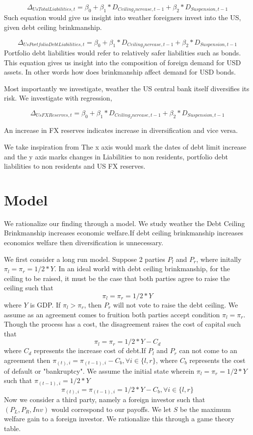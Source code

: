 \documentclass[12pt]{article}
\begin{document}
$$\Delta_{UsTotalLiabilities,t}=\beta_0+\beta_1*D_{Ceiling_Increase,t-1}+\beta_2*D_{Suspension,t-1}$$ Such equation would give us insight into weather foreigners invest into the US, given debt ceiling brinkmanship. 

$$\Delta_{UsPortfolio Debt Liabilities,t}=\beta_0+\beta_1*D_{Ceiling_Increase,t-1}+\beta_2*D_{Suspension,t-1}$$ 
Portfolio debt liabilities would refer to relatively safer liabilities such as bonds. This equation gives us insight into the composition of foreign demand for USD assets. In other words how does brinkmanship affect demand for USD bonds. 

Most importantly we investigate, weather the US central bank itself diversifies its risk. We investigate with regression, 

$$\Delta_{UsFX Reserves,t}=\beta_0+\beta_1*D_{Ceiling_Increase,t-1}+\beta_2*D_{Suspension,t-1}$$

An increase in FX reserves indicates increase in diversification and vice versa. 


We take inspiration from 
 \noindent The x axis would mark the dates of debt limit increase and the y axis marks changes in Liabilities to non residents, portfolio debt  liabilities to non residents and US FX reserves. 

\section{Model 
\label{sec:Model}}
We rationalize our finding through a model. We study weather the Debt Ceiling Brinkmanship increases economic welfare.If debt ceiling brinkmanship increases economics welfare then diversification is unnecessary. 


\noindent We first consider a long run model.
Suppose 2 parties $P_l$ and $P_r$, where initally $\pi_l=\pi_r=1/2*Y$. In an ideal world with debt ceiling brinkmanship, for the ceiling to be raised, it must be the case that both parties agree to raise the ceiling such that
$$\pi_l=\pi_r=1/2*Y$$
where $Y$ is GDP. If $\pi_l > \pi_r$, then $P_r$ will not vote to raise the debt ceiling. We assume as an agreement comes to fruition both parties accept condition $\pi_l=\pi_r$. Though the process has a cost, the disagreement raises the cost of capital such that $$\pi_l=\pi_r=1/2*Y-C_d$$
where $C_d$ represents the increase cost of debt.If  $P_l$ and $P_r$ can not come to an agreement then $\pi_{(t),i} = \pi_{(t-1),i}-C_b , \forall i \in \{l,r\}$, where $C_b$ represents the cost of default or "bankruptcy". We assume the initial state wherein $\pi_l=\pi_r=1/2*Y$ such that $\pi_{(t-1),i}=1/2*Y$
$$\pi_{(t),i} = \pi_{(t-1),i}=1/2*Y-C_b , \forall i \in \{l,r\}$$ Now we consider a third party, namely a foreign investor such that 
$(P_L,P_R,Inv)$ would correspond to our payoffs. We let $S$ be the  maximum welfare gain to a foreign investor.
We rationalize this through a game theory table.
\end{document}
